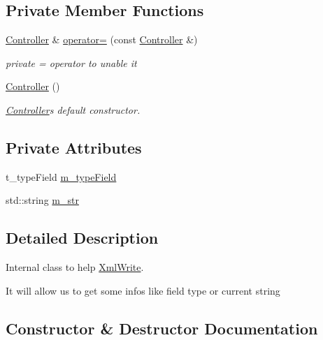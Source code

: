 \subsection*{Private Member Functions}
\begin{DoxyCompactItemize}
\item 
\hyperlink{class_xml_write_1_1_controller}{Controller} \& \hyperlink{class_xml_write_1_1_controller_afa8887a15fc9dc5a2b3398cbdd4d2aca}{operator=} (const \hyperlink{class_xml_write_1_1_controller}{Controller} \&)
\begin{DoxyCompactList}\small\item\em private = operator to unable it \end{DoxyCompactList}\item 
\hyperlink{class_xml_write_1_1_controller_afb416b62a308e87f8a7a230fdd827d35}{Controller} ()
\begin{DoxyCompactList}\small\item\em \hyperlink{class_xml_write_1_1_controller}{Controller}\textquotesingle{}s default constructor. \end{DoxyCompactList}\end{DoxyCompactItemize}
\subsection*{Private Attributes}
\begin{DoxyCompactItemize}
\item 
t\+\_\+type\+Field \hyperlink{class_xml_write_1_1_controller_a27f80601efc5395ae90f818868a828d4}{m\+\_\+type\+Field}
\item 
std\+::string \hyperlink{class_xml_write_1_1_controller_a8ca816bebca4235fa19e6814486cd1d7}{m\+\_\+str}
\end{DoxyCompactItemize}


\subsection{Detailed Description}
Internal class to help \hyperlink{class_xml_write}{Xml\+Write}. 

It will allow us to get some infos like field type or current string 

\subsection{Constructor \& Destructor Documentation}
\hypertarget{class_xml_write_1_1_controller_a2dbbed59623365f8c6b65cd4b7f13d42}{}
